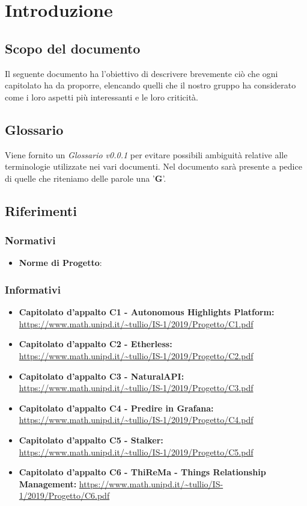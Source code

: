 
\section{Introduzione}
\subsection{Scopo del documento}
Il seguente documento ha l'obiettivo di descrivere brevemente ciò che ogni capitolato ha da proporre, elencando quelli che il nostro gruppo ha considerato come i loro aspetti più interessanti e le loro criticità. 

\subsection{Glossario}
Viene fornito un \textit{Glossario v0.0.1} per evitare possibili ambiguità relative alle terminologie utilizzate nei vari documenti. Nel documento sarà presente a pedice di quelle che riteniamo delle parole una '\textbf{G}'.   
\subsection{Riferimenti}
    \subsubsection{Normativi}
    \begin{itemize}
      \item \textbf{Norme di Progetto}: 
    \end{itemize}
    \subsubsection{Informativi}
    \begin{itemize}
      \item \textbf{Capitolato d'appalto C1 - Autonomous Highlights Platform:} \url{https://www.math.unipd.it/~tullio/IS-1/2019/Progetto/C1.pdf}
      \item \textbf{Capitolato d'appalto C2 - Etherless:} \url{https://www.math.unipd.it/~tullio/IS-1/2019/Progetto/C2.pdf}
      \item \textbf{Capitolato d'appalto C3 - NaturalAPI:} \url{https://www.math.unipd.it/~tullio/IS-1/2019/Progetto/C3.pdf}
      \item \textbf{Capitolato d'appalto C4 - Predire in Grafana:} \url{https://www.math.unipd.it/~tullio/IS-1/2019/Progetto/C4.pdf}
      \item \textbf{Capitolato d'appalto C5 - Stalker:} \url{https://www.math.unipd.it/~tullio/IS-1/2019/Progetto/C5.pdf}
      \item \textbf{Capitolato d'appalto C6 - ThiReMa - Things Relationship Management:} \url{https://www.math.unipd.it/~tullio/IS-1/2019/Progetto/C6.pdf}
    \end{itemize}
    
  

